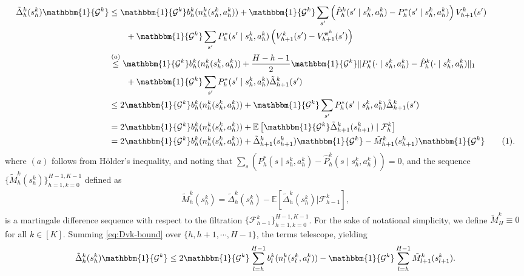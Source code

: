 \documentclass[11pt]{article}
\newcommand{\pii}{\boldsymbol{\pi}}
\newcommand{\E} {\mathbb{E}}
\newcommand{\Dvk}{\tilde{\Delta}}
\newcommand{\Dvkm}{\tilde{M}}
\newcommand\numberthis{\addtocounter{equation}{1}\tag{\theequation}}
\begin{document}
\begin{align*}
\Dvk_h^k(s_h^k) \mathbbm{1}\{\mathcal{G}^k\}
&\leq \mathbbm{1}\{\mathcal{G}^k\} b_h^k(n_h^k(s_h^k,a_h^k))  + \mathbbm{1}\{\mathcal{G}^k\} \sum_{s'} \left( \hat{P}^k_h(s'\mid s_h^k,a_h^k) - P^*_h(s'\mid s_h^k,a_h^k)\right) V_{h+1}^{k}(s') \\
& \qquad +\mathbbm{1}\{\mathcal{G}^k\} \sum_{s'} P^*_h(s'\mid s_h^k,a_h^k) \left( V_{h+1}^{k}(s')  - V_{h+1}^{\pii^k}(s')\right) \\
& \stackrel{(a)}{\leq} \mathbbm{1}\{\mathcal{G}^k\} b_h^k(n_h^k(s_h^k,a_h^k))  + \frac{H-h-1}{2} \mathbbm{1}\{\mathcal{G}^k\} \|P_h^*(\cdot \mid s_h^k, a_h^k) - \hat{P}_h^k(\cdot \mid s_h^k, a_h^k)\|_1  \\
&\qquad+ \mathbbm{1}\{\mathcal{G}^k\}\sum_{s'} P^*_h(s'\mid s_h^k,a_h^k) \Dvk_{h+1}^k(s')\\
& \leq 2 \mathbbm{1}\{\mathcal{G}^k\} b^k_h(n_h^k(s_h^k, a_h^k))  + \mathbbm{1}\{\mathcal{G}^k\} \sum_{s'} P^*_h(s'\mid s_h^k,a_h^k) \Dvk_{h+1}^k(s') \\
& = 2 \mathbbm{1}\{\mathcal{G}^k\} b^k_h(n_h^k(s_h^k, a_h^k))  + \mathbb{E}\left[ \mathbbm{1}\{\mathcal{G}^k\}\Dvk_{h+1}^{k}(s_{h+1}^k) \mid \mathcal{F}_h^k \right]\\
& = 2 \mathbbm{1}\{\mathcal{G}^k\} b^k_h(n_h^k(s_h^k, a_h^k))  + \Dvk_{h+1}^{k}(s_{h+1}^k)\mathbbm{1}\{\mathcal{G}^k\} - \Dvkm_{h+1}^{k}(s_{h+1}^k)\mathbbm{1}\{\mathcal{G}^k\}\numberthis\label{eq:Dvk-bound}.
\end{align*}
where $(a)$ follows from H\"{o}lder's inequality, and noting that $\sum_{s} ( P_h^*(s \mid s_h^k, a_h^k) - \hat{P}_h^k(s \mid s_h^k, a_h^k) ) = 0$, and the sequence $\{\Dvkm^k_{h}(s_{h}^k)\}_{h=1,k=0}^{H-1,K-1}$ defined as 
\begin{align*}
    \Dvkm^k_{h}(s_{h}^k) = \Dvk^k_{h}(s_{h}^k) - \E\left[\Dvk^k_{h}(s_{h}^k)\big| \mathcal{F}_{h-1}^{k} \right],
\end{align*}
is a martingale difference sequence with respect to the filtration $\{\mathcal{F}_{h-1}^{k}\}_{h=1,k=0}^{H-1,K-1}$. For the sake of notational simplicity, we define $\Dvkm^k_{H}\equiv 0$ for all $k\in[K]$. Summing \eqref{eq:Dvk-bound} over $\{h,h+1,\cdots,H-1\}$, the terms telescope, yielding
\begin{align}
    \Dvk_h^k(s_h^k)\mathbbm{1}\{\mathcal{G}^k\} \leq 2 \mathbbm{1}\{\mathcal{G}^k\} \sum_{l=h}^{H-1}  b^k_l(n_l^k(s_l^k, a_l^k))  -  \mathbbm{1}\{\mathcal{G}^k\} \sum_{l=h}^{H-1} \Dvkm_{l+1}^{k}(s_{l+1}^k).\label{eq:Dvk-finalBound}
\end{align}
\end{document}
